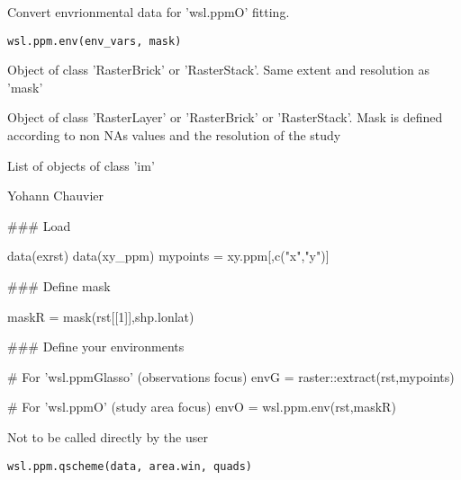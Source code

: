 \documentclass[a4paper]{book}
\begin{document}
%
\begin{Description}\relax
Convert envrionmental data for 'wsl.ppmO' fitting.
\end{Description}
%
\begin{Usage}
\begin{verbatim}
wsl.ppm.env(env_vars, mask)
\end{verbatim}
\end{Usage}
%
\begin{Arguments}
\begin{ldescription}
\item[\code{env\_vars}] Object of class 'RasterBrick' or 'RasterStack'. Same extent and resolution as 'mask'

\item[\code{mask}] Object of class 'RasterLayer' or 'RasterBrick' or 'RasterStack'. Mask is defined
according to non NAs values and the resolution of the study
\end{ldescription}
\end{Arguments}
%
\begin{Value}
List of objects of class 'im'
\end{Value}
%
\begin{Author}\relax
Yohann Chauvier
\end{Author}
%
\begin{Examples}
\begin{ExampleCode}

### Load

data(exrst)
data(xy_ppm)
mypoints = xy.ppm[,c("x","y")]

### Define mask

maskR = mask(rst[[1]],shp.lonlat)

### Define your environments

   # For 'wsl.ppmGlasso' (observations focus)
envG = raster::extract(rst,mypoints)

   # For 'wsl.ppmO' (study area focus)
envO = wsl.ppm.env(rst,maskR)

\end{ExampleCode}
\end{Examples}
%
\begin{Description}\relax
Not to be called directly by the user
\end{Description}
%
\begin{Usage}
\begin{verbatim}
wsl.ppm.qscheme(data, area.win, quads)
\end{verbatim}
\end{Usage}
\end{document}
